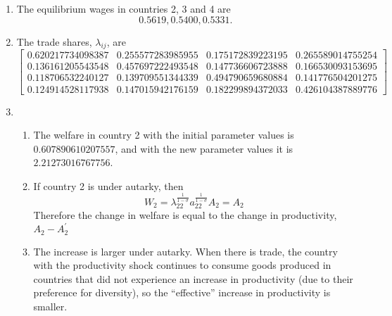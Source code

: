 \documentclass{article}
\begin{document}
\begin{enumerate}
	\item The equilibrium wages in countries 2, 3 and 4 are
	\[
	0.5619, 0.5400, 0.5331.
	\]
	
	\item The trade shares, $\lambda_{ij}$, are
	\[
	\begin{bmatrix}
0.620217734098387 &	0.255577283985955	& 0.175172839223195	& 0.265589014755254 \\
0.136161205543548 &	0.457697222493548	& 0.147736606723888	& 0.166530093153695 \\
0.118706532240127 &	0.139709551344339	& 0.494790659680884	& 0.141776504201275 \\
0.124914528117938 &	0.147015942176159	& 0.182299894372033	& 0.426104387889776 
	\end{bmatrix}
	\]
	
	\item %
	\begin{enumerate}
		\item The welfare in country 2 with the initial parameter values is $0.607890610207557$, and with the new parameter values it is $2.21273016767756$.	
		
		\item %
		If country 2 is under autarky, then
		\[W_{2} = \lambda_{22}^{\frac{1}{1-\sigma}}a_{22}^{\frac{1}{1-\sigma}}A_2 = A_2\]
		Therefore the change in welfare is equal to the change in productivity, $A_{2}-A_{2}^{\prime}$
		
		\item %
The increase is larger under autarky. When there is trade, the country with the productivity shock continues to consume goods produced in countries that did not experience an increase in productivity (due to their preference for diversity), so the ``effective'' increase in productivity is smaller.
	\end{enumerate}
	

\end{enumerate}
\end{document}
